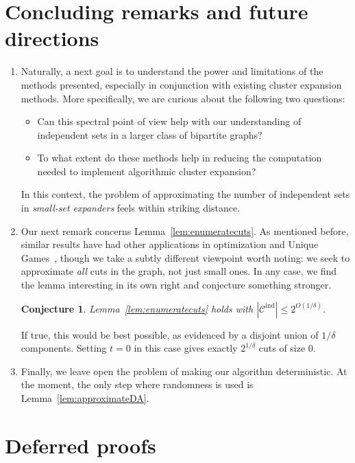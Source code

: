 \documentclass[11pt,letterpaper]{amsart}
\newtheorem{conjecture}[theorem]{Conjecture}
\theoremstyle{definition}
\newcommand*{\Cind}{\mathcal{C}^{\mathrm{ind}}}
\begin{document}
\section{Concluding remarks and future directions}
\begin{enumerate}[wide, labelwidth=!, labelindent=0pt]
\item[1.] Naturally, a next goal is to understand the power and limitations of the methods presented, especially in conjunction with existing cluster expansion methods. More specifically, we are curious about the following two questions: 
\begin{itemize}
\item[i.] Can this spectral point of view help with our understanding of independent sets in a larger class of bipartite graphs?
\item[ii.] To what extent do these methods help in reducing the computation needed to implement algorithmic cluster expansion? 
\end{itemize}
In this context, the problem of approximating the number of independent sets in \emph{small-set expanders} feels within striking distance.\\
\item[2.] Our next remark concerns Lemma~\ref{lem:enumeratecuts}. As mentioned before, similar results have had other applications in optimization and Unique Games~\cite{ABS10,Kol10,KT07}, though we take a subtly different viewpoint worth noting: we seek to approximate \emph{all} cuts in the graph, not just small ones. In any case, we find the lemma interesting in its own right and conjecture something stronger.
\begin{conjecture} Lemma~\ref{lem:enumeratecuts} holds with $|\Cind| \leq 2^{O(1/\delta)}$.
\end{conjecture}
If true, this would be best possible, as evidenced by a disjoint union of $1/\delta$ components. Setting $t = 0$ in this case gives exactly $2^{1/\delta}$ cuts of size $0$.\\
\item[3.] Finally, we leave open the problem of making our algorithm deterministic. At the moment, the only step where randomness is used is Lemma~\ref{lem:approximateDA}. 
\end{enumerate}






\appendix
\section{Deferred proofs}\label{app:deferred}
\end{document}
